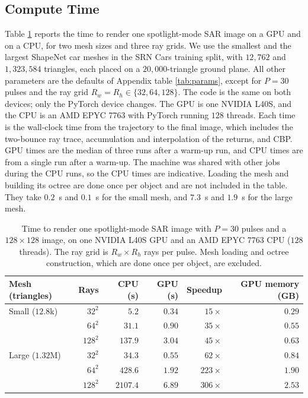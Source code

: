 \documentclass[sensors,article,submit,moreauthors]{Definitions/mdpi}
\begin{document}
\subsection{Compute Time}
\label{sec:compute-time}

Table \ref{tab:compute-time} reports the time to render one spotlight-mode SAR
image on a GPU and
on a CPU, for two mesh sizes and three ray grids. We use the smallest and the
largest ShapeNet
\cite{shapenet} car meshes in the SRN Cars \cite{srn} training split, with
$12{,}762$ and $1{,}323{,}584$ triangles, each placed on a
$20{,}000$-triangle ground plane. All other parameters are the defaults of Appendix table
\ref{tab:params},
except for $P = 30$ pulses and the ray grid $R_w = R_h \in \{32, 64, 128\}$. The
code is the same on
both devices; only the PyTorch device changes. The GPU is one NVIDIA L40S, and
the CPU is an AMD EPYC
7763 with PyTorch running $128$ threads. Each time is the wall-clock time from
the trajectory to the
final image, which includes the two-bounce ray trace, accumulation and
interpolation of the returns, and CBP. GPU times are
the median of three runs after a warm-up run, and CPU times are from a single
run after a warm-up.
The machine was shared with other jobs during the CPU runs, so the CPU times are
indicative. Loading
the mesh and building its octree are done once per object and are not included
in the table. They
take $0.2$~s and $0.1$~s for the small mesh, and $7.3$~s and $1.9$~s for the
large mesh.

\begin{table}[H]
\caption{Time to render one spotlight-mode SAR image with $P = 30$ pulses and a
$128 \times 128$
image, on one NVIDIA L40S GPU and an AMD EPYC 7763 CPU ($128$ threads). The ray
grid is
$R_w \times R_h$ rays per pulse. Mesh loading and octree construction, which are
done once per object,
are excluded.}
\label{tab:compute-time}
\centering
\begin{tabular}{lrrrrr}
\toprule
\textbf{Mesh (triangles)} & \textbf{Rays} & \textbf{CPU (s)} & \textbf{GPU (s)}
& \textbf{Speedup} & \textbf{GPU memory (GB)} \\
\midrule
Small ($12.8$k) & $32^2$  & $5.2$    & $0.34$ & $15\times$  & $0.29$ \\
                & $64^2$  & $31.1$   & $0.90$ & $35\times$  & $0.55$ \\
                & $128^2$ & $137.9$  & $3.04$ & $45\times$  & $0.63$ \\
\midrule
Large ($1.32$M) & $32^2$  & $34.3$   & $0.55$ & $62\times$  & $0.84$ \\
                & $64^2$  & $428.6$  & $1.92$ & $223\times$ & $1.90$ \\
                & $128^2$ & $2107.4$ & $6.89$ & $306\times$ & $2.53$ \\
\bottomrule
\end{tabular}
\end{table}
\end{document}
